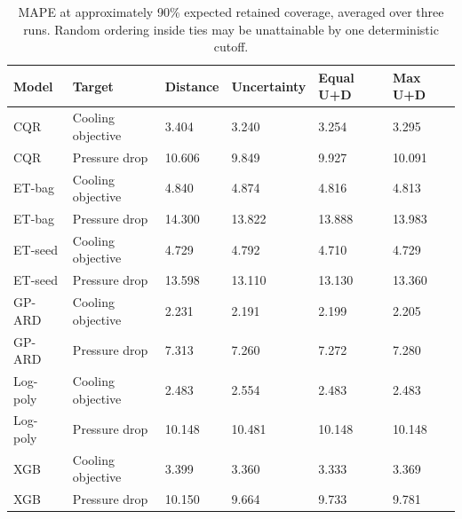 \begin{table}[htbp]\centering\small\setlength{\tabcolsep}{3pt}\begin{tabular}{llllll}
\toprule
Model & Target & Distance & Uncertainty & Equal U+D & Max U+D\\\midrule
CQR & Cooling objective & 3.404 & 3.240 & 3.254 & 3.295\\
CQR & Pressure drop & 10.606 & 9.849 & 9.927 & 10.091\\
ET-bag & Cooling objective & 4.840 & 4.874 & 4.816 & 4.813\\
ET-bag & Pressure drop & 14.300 & 13.822 & 13.888 & 13.983\\
ET-seed & Cooling objective & 4.729 & 4.792 & 4.710 & 4.729\\
ET-seed & Pressure drop & 13.598 & 13.110 & 13.130 & 13.360\\
GP-ARD & Cooling objective & 2.231 & 2.191 & 2.199 & 2.205\\
GP-ARD & Pressure drop & 7.313 & 7.260 & 7.272 & 7.280\\
Log-poly & Cooling objective & 2.483 & 2.554 & 2.483 & 2.483\\
Log-poly & Pressure drop & 10.148 & 10.481 & 10.148 & 10.148\\
XGB & Cooling objective & 3.399 & 3.360 & 3.333 & 3.369\\
XGB & Pressure drop & 10.150 & 9.664 & 9.733 & 9.781\\
\bottomrule\end{tabular}\caption{MAPE at approximately 90\% expected retained coverage, averaged over three runs. Random ordering inside ties may be unattainable by one deterministic cutoff.}\label{tab:ubend-matched_risk}\end{table}
